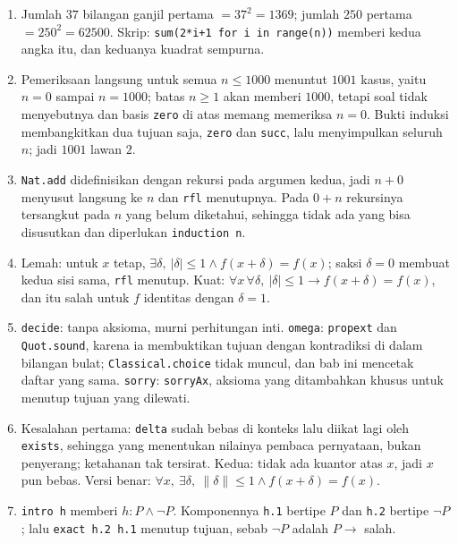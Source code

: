\begin{enumerate}[label=\textbf{28.\arabic*}]
  \item Jumlah $37$ bilangan ganjil pertama $=37^{2}=1369$; jumlah $250$ pertama
        $=250^{2}=62500$. Skrip: \texttt{sum(2*i+1 for i in range(n))} memberi
        kedua angka itu, dan keduanya kuadrat sempurna.

  \item        Pemeriksaan langsung untuk semua $n\le1000$ menuntut $1001$ kasus, yaitu
        $n=0$ sampai $n=1000$; batas $n\ge1$ akan memberi $1000$, tetapi soal tidak
        menyebutnya dan basis \texttt{zero} di atas memang memeriksa $n=0$. Bukti
        induksi membangkitkan dua tujuan saja, \texttt{zero} dan \texttt{succ}, lalu
        menyimpulkan seluruh $n$; jadi $1001$ lawan $2$.

  \item \texttt{Nat.add} didefinisikan dengan rekursi pada argumen kedua, jadi
        $n+0$ menyusut langsung ke $n$ dan \texttt{rfl} menutupnya. Pada $0+n$
        rekursinya tersangkut pada $n$ yang belum diketahui, sehingga tidak ada
        yang bisa disusutkan dan diperlukan \texttt{induction n}.

  \item 
Lemah: untuk $x$ tetap, $\exists\delta,\ |\delta|\le1\wedge
        f(x+\delta)=f(x)$; saksi $\delta=0$ membuat kedua sisi sama, \texttt{rfl}
        menutup. Kuat: $\forall x\,\forall\delta,\ |\delta|\le1\to
        f(x+\delta)=f(x)$, dan itu salah untuk $f$ identitas dengan $\delta=1$.

  \item 
\texttt{decide}: tanpa aksioma, murni perhitungan inti. \texttt{omega}:
        \texttt{propext} dan \texttt{Quot.sound}, karena ia membuktikan tujuan
        dengan kontradiksi di dalam bilangan bulat; \texttt{Classical.choice} tidak
        muncul, dan bab ini mencetak daftar yang sama. \texttt{sorry}:
        \texttt{sorryAx}, aksioma yang ditambahkan khusus untuk menutup tujuan yang
        dilewati.

  \item Kesalahan pertama: \texttt{delta} sudah bebas di konteks lalu diikat lagi
        oleh \texttt{exists}, sehingga yang menentukan nilainya pembaca pernyataan,
        bukan penyerang; ketahanan tak tersirat. Kedua: tidak ada kuantor atas $x$,
        jadi $x$ pun bebas. Versi benar:
        $\forall x,\ \exists\delta,\ \lVert\delta\rVert\le1\wedge f(x+\delta)=f(x)$.

  \item \texttt{intro h} memberi $h:P\wedge\neg P$. Komponennya \texttt{h.1} bertipe
        $P$ dan \texttt{h.2} bertipe $\neg P$; lalu \texttt{exact h.2 h.1} menutup
        tujuan, sebab $\neg P$ adalah $P\to$ salah.
\end{enumerate}

